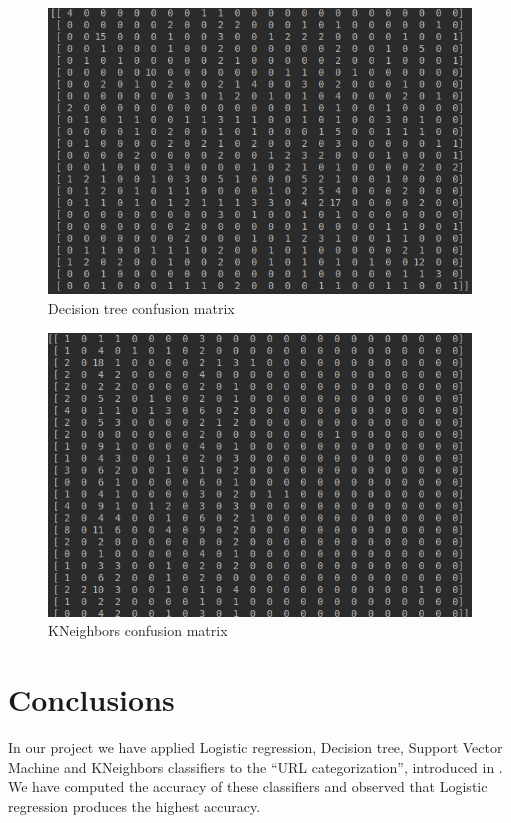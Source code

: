 \documentclass{article} %
\begin{document}
\begin{figure}
	\includegraphics[width=\linewidth]{dc_confusion.png}
	\caption{Decision tree confusion matrix}
	\label{fig:dc_confusion.png}
\end{figure}

\begin{figure}
	\includegraphics[width=\linewidth]{knb_confusion.png}
	\caption{KNeighbors confusion matrix}
	\label{fig:knb_confusion.png}
\end{figure}


\section{Conclusions}
  In our project we have applied  Logistic regression, Decision tree, Support Vector Machine and KNeighbors classifiers  to the ``URL categorization'', introduced in \cite{url_class}. We have computed the accuracy of these classifiers and observed that Logistic regression produces the highest accuracy.

 
 
\end{document}
